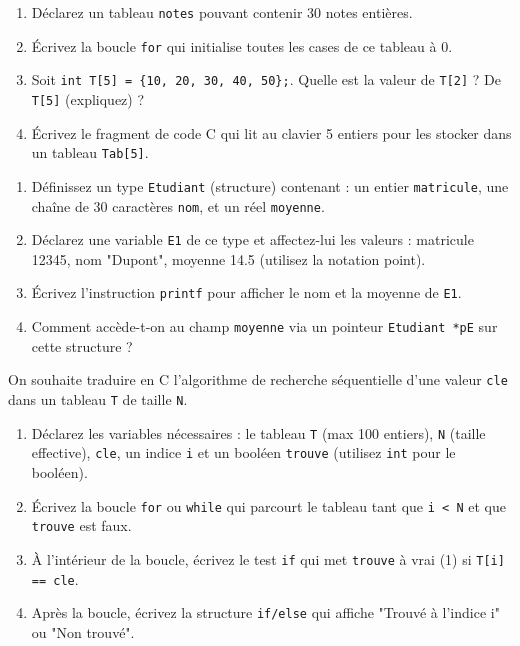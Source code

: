 \documentclass[11pt]{article}
\begin{document}
\begin{exercice}
\begin{enumerate}
    \item Déclarez un tableau \texttt{notes} pouvant contenir 30 notes entières.
    \item Écrivez la boucle \texttt{for} qui initialise toutes les cases de ce tableau à 0.
    \item Soit \texttt{int T[5] = \{10, 20, 30, 40, 50\};}. Quelle est la valeur de \texttt{T[2]} ? De \texttt{T[5]} (expliquez) ?
    \item Écrivez le fragment de code C qui lit au clavier 5 entiers pour les stocker dans un tableau \texttt{Tab[5]}.
\end{enumerate}
\end{exercice}

\begin{exercice}
\begin{enumerate}
    \item Définissez un type \texttt{Etudiant} (structure) contenant : un entier \texttt{matricule}, une chaîne de 30 caractères \texttt{nom}, et un réel \texttt{moyenne}.
    \item Déclarez une variable \texttt{E1} de ce type et affectez-lui les valeurs : matricule 12345, nom "Dupont", moyenne 14.5 (utilisez la notation point).
    \item Écrivez l'instruction \texttt{printf} pour afficher le nom et la moyenne de \texttt{E1}.
    \item Comment accède-t-on au champ \texttt{moyenne} via un pointeur \texttt{Etudiant *pE} sur cette structure ?
\end{enumerate}
\end{exercice}

\begin{exercice}
On souhaite traduire en C l'algorithme de recherche séquentielle d'une valeur \texttt{cle} dans un tableau \texttt{T} de taille \texttt{N}.
\begin{enumerate}
    \item Déclarez les variables nécessaires : le tableau \texttt{T} (max 100 entiers), \texttt{N} (taille effective), \texttt{cle}, un indice \texttt{i} et un booléen \texttt{trouve} (utilisez \texttt{int} pour le booléen).
    \item Écrivez la boucle \texttt{for} ou \texttt{while} qui parcourt le tableau tant que \texttt{i < N} et que \texttt{trouve} est faux.
    \item À l'intérieur de la boucle, écrivez le test \texttt{if} qui met \texttt{trouve} à vrai (1) si \texttt{T[i] == cle}.
    \item Après la boucle, écrivez la structure \texttt{if/else} qui affiche "Trouvé à l'indice i" ou "Non trouvé".
\end{enumerate}
\end{exercice}
\end{document}
